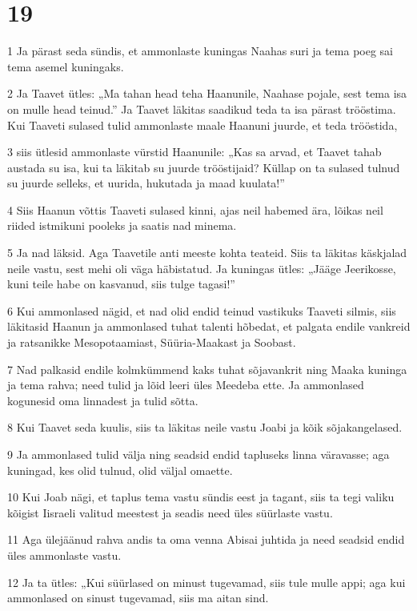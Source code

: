 \chapter{19}

\par 1 Ja pärast seda sündis, et ammonlaste kuningas Naahas suri ja tema poeg sai tema asemel kuningaks.
\par 2 Ja Taavet ütles: „Ma tahan head teha Haanunile, Naahase pojale, sest tema isa on mulle head teinud.” Ja Taavet läkitas saadikud teda ta isa pärast trööstima. Kui Taaveti sulased tulid ammonlaste maale Haanuni juurde, et teda trööstida,
\par 3 siis ütlesid ammonlaste vürstid Haanunile: „Kas sa arvad, et Taavet tahab austada su isa, kui ta läkitab su juurde trööstijaid? Küllap on ta sulased tulnud su juurde selleks, et uurida, hukutada ja maad kuulata!”
\par 4 Siis Haanun võttis Taaveti sulased kinni, ajas neil habemed ära, lõikas neil riided istmikuni pooleks ja saatis nad minema.
\par 5 Ja nad läksid. Aga Taavetile anti meeste kohta teateid. Siis ta läkitas käskjalad neile vastu, sest mehi oli väga häbistatud. Ja kuningas ütles: „Jääge Jeerikosse, kuni teile habe on kasvanud, siis tulge tagasi!”
\par 6 Kui ammonlased nägid, et nad olid endid teinud vastikuks Taaveti silmis, siis läkitasid Haanun ja ammonlased tuhat talenti hõbedat, et palgata endile vankreid ja ratsanikke Mesopotaamiast, Süüria-Maakast ja Soobast.
\par 7 Nad palkasid endile kolmkümmend kaks tuhat sõjavankrit ning Maaka kuninga ja tema rahva; need tulid ja lõid leeri üles Meedeba ette. Ja ammonlased kogunesid oma linnadest ja tulid sõtta.
\par 8 Kui Taavet seda kuulis, siis ta läkitas neile vastu Joabi ja kõik sõjakangelased.
\par 9 Ja ammonlased tulid välja ning seadsid endid tapluseks linna väravasse; aga kuningad, kes olid tulnud, olid väljal omaette.
\par 10 Kui Joab nägi, et taplus tema vastu sündis eest ja tagant, siis ta tegi valiku kõigist Iisraeli valitud meestest ja seadis need üles süürlaste vastu.
\par 11 Aga ülejäänud rahva andis ta oma venna Abisai juhtida ja need seadsid endid üles ammonlaste vastu.
\par 12 Ja ta ütles: „Kui süürlased on minust tugevamad, siis tule mulle appi; aga kui ammonlased on sinust tugevamad, siis ma aitan sind.
